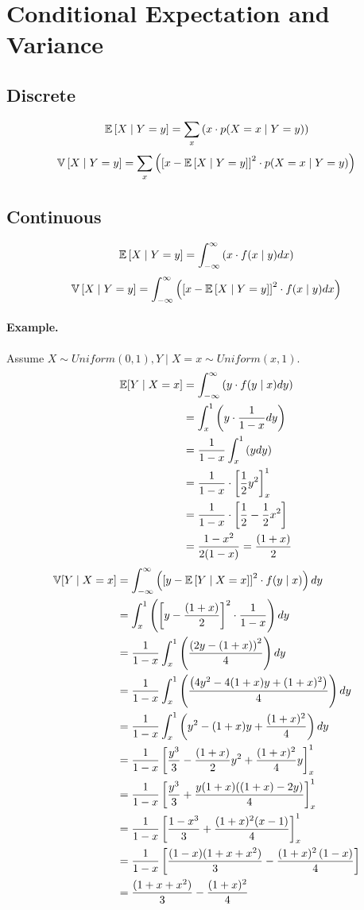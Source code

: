 \section{Conditional Expectation and Variance}

\subsection{Discrete}
\[\operatorname{\mathbb{E}}\left[X\mid Y=y\right] = \sum_x \left(x \cdot p(X=x \mid Y=y)\right)\]
\[\operatorname{\mathbb{V}}\left[X\mid Y=y\right] = \sum_x \left(\left[x-\operatorname{\mathbb{E}}\left[X\mid Y=y\right]\right]^2 \cdot p(X=x \mid Y=y)\right)\]

\subsection{Continuous}
\[\operatorname{\mathbb{E}}\left[X\mid Y=y\right] = \int_{-\infty}^\infty \left(x \cdot f(x\mid y) dx\right)\]
\[\operatorname{\mathbb{V}}\left[X\mid Y=y\right] = \int_{-\infty}^\infty \left(\left[x-\operatorname{\mathbb{E}}\left[X\mid Y=y\right]\right]^2 \cdot f(x\mid y) dx\right)\]

\paragraph{Example.}
Assume $X\sim Uniform(0,1), Y\mid X=x \sim Uniform(x,1)$. 
\begin{align*}
\operatorname{\mathbb{E}}[Y\mid X=x] &= \int_{-\infty}^\infty \left(y \cdot f(y\mid x) dy\right) \\
&= \int_x^1 \left(y \cdot \frac{1}{1-x} dy\right)\\
&= \frac{1}{1-x} \int_x^1 \left(y dy\right)\\
&= \frac{1}{1-x} \cdot \left[\frac{1}{2}y^2\right]^1_x\\
&= \frac{1}{1-x} \cdot \left[\frac{1}{2}-\frac{1}{2}x^2\right]\\
&= \frac{1-x^2}{2(1-x)} = \frac{(1+x)}{2}
\end{align*}
\begin{align*}
\operatorname{\mathbb{V}}[Y\mid X=x] &= \int_{-\infty}^\infty  \left(\left[y-\operatorname{\mathbb{E}}\left[Y\mid X=x\right]\right]^2 \cdot f(y\mid x) \right)dy \\
& =  \int_x^1  \left(\left[y - \frac{(1+x)}{2}\right]^2 \cdot  \frac{1}{1-x} \right)dy\\
& =  \frac{1}{1-x} \int_x^1  \left(\frac{\left(2y - (1 +x)\right)^2}{4} \right)dy\\
& = \frac{1}{1-x} \int_x^1  \left(\frac{\left(4y^2 - 4(1 +x)y + (1 +x)^2\right)}{4} \right)dy\\
& = \frac{1}{1-x} \int_x^1  \left(y^2 - (1+x)y +\frac{(1 +x)^2}{4} \right)dy\\
& = \frac{1}{1-x} \left[\frac{y^3}{3} - \frac{(1+x)}{2}y^2 +\frac{(1 +x)^2}{4}y \right]^1_x\\
& = \frac{1}{1-x} \left[\frac{y^3}{3} + \frac{y(1+x)((1+x)-2y)}{4} \right]^1_x\\
& = \frac{1}{1-x} \left[\frac{1-x^3}{3} + \frac{(1+x)^2(x-1)}{4} \right]^1_x\\
& = \frac{1}{1-x} \left[ \frac{(1-x)(1+x+x^2)}{3} - \frac{(1+x)^2\left(1-x\right)}{4} \right]\\
& = \frac{(1+x+x^2)}{3} -\frac{(1+x)^2}{4}
\end{align*}

